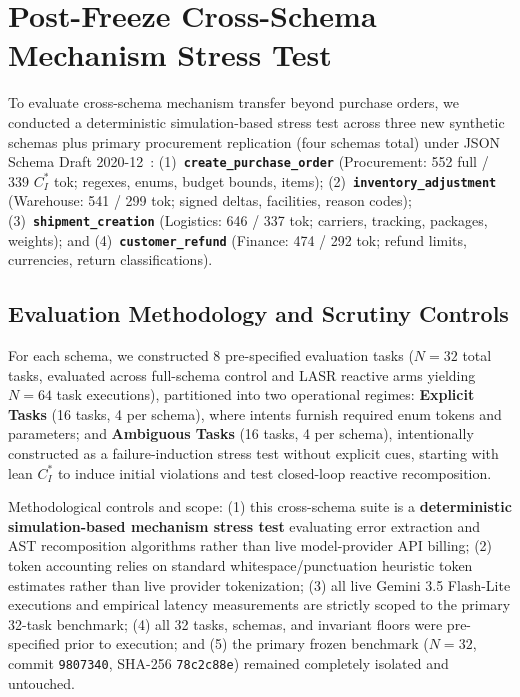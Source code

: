 \section{Post-Freeze Cross-Schema Mechanism Stress Test}
\label{sec:cross_schema}


To evaluate cross-schema mechanism transfer beyond purchase orders, we conducted a deterministic simulation-based stress test across three new synthetic schemas plus primary procurement replication (four schemas total) under JSON Schema Draft 2020-12~\cite{jsonschema202012}: (1)~\textbf{\texttt{create\_purchase\_order}} (Procurement: 552 full / 339 $C_I^*$ tok; regexes, enums, budget bounds, items); (2)~\textbf{\texttt{inventory\_adjustment}} (Warehouse: 541 / 299 tok; signed deltas, facilities, reason codes); (3)~\textbf{\texttt{shipment\_creation}} (Logistics: 646 / 337 tok; carriers, tracking, packages, weights); and (4)~\textbf{\texttt{customer\_refund}} (Finance: 474 / 292 tok; refund limits, currencies, return classifications).

\subsection{Evaluation Methodology and Scrutiny Controls}
For each schema, we constructed 8 pre-specified evaluation tasks ($N=32$ total tasks, evaluated across full-schema control and LASR reactive arms yielding $N=64$ task executions), partitioned into two operational regimes: \textbf{Explicit Tasks} (16 tasks, 4 per schema), where intents furnish required enum tokens and parameters; and \textbf{Ambiguous Tasks} (16 tasks, 4 per schema), intentionally constructed as a failure-induction stress test without explicit cues, starting with lean $C_I^*$ to induce initial violations and test closed-loop reactive recomposition.

Methodological controls and scope: (1) this cross-schema suite is a \textbf{deterministic simulation-based mechanism stress test} evaluating error extraction and AST recomposition algorithms rather than live model-provider API billing; (2) token accounting relies on standard whitespace/punctuation heuristic token estimates rather than live provider tokenization; (3) all live Gemini 3.5 Flash-Lite executions and empirical latency measurements are strictly scoped to the primary 32-task benchmark; (4) all 32 tasks, schemas, and invariant floors were pre-specified prior to execution; and (5) the primary frozen benchmark ($N=32$, commit \texttt{9807340}, SHA-256 \texttt{78c2c88e}) remained completely isolated and untouched.

